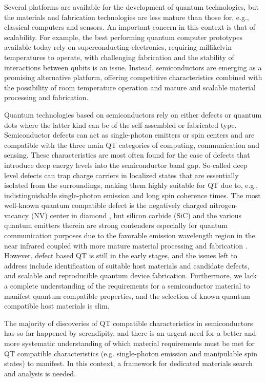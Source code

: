 \documentclass[superscriptaddress,unsortedaddress,
 amsmath,amssymb,
 aps,
]{revtex4-2}
\begin{document}
Several platforms are available for the development of quantum technologies, but the materials and fabrication technologies are less mature than those for, e.g., classical computers and sensors. 
An important concern in this context is that of scalability. 
For example, the best performing quantum computer prototypes available today rely on superconducting electronics, requiring millikelvin temperatures to operate, with challenging fabrication and the stability of interactions between qubits is an issue. Instead, semiconductors are emerging as a promising alternative platform, offering competitive characteristics combined with the possibility of room temperature operation and mature and scalable material processing and fabrication.  

Quantum technologies based on semiconductors rely on either defects or quantum dots where the latter kind can be of the self-assembled or fabricated type. 
Semiconductor defects can act as single-photon emitters or spin centers and are compatible with the three main QT categories of computing, communication and sensing.  
These characteristics are most often found for the case of defects that introduce deep energy levels into the semiconductor band gap. So-called deep level defects can trap charge carriers in localized states that are essentially isolated from the surroundings, making them highly suitable for QT due to, e.g., indistinguishable single-photon emission and long spin coherence times. 
The most well-known quantum compatible defect is the negatively charged nitrogen-vacancy (NV) center in diamond \cite{Doherty_2013}, but silicon carbide (SiC) and the various quantum emitters therein are strong contenders especially for quantum communication purposes due to the favorable emission wavelength region in the near infrared coupled with more mature material processing and fabrication \cite{Bathen2021}. 
However, defect based QT is still in the early stages, and the issues left to address include identification of suitable host materials and candidate defects, and scalable and reproducible quantum device fabrication. 
Furthermore, we lack a complete understanding of the requirements for a semiconductor material to manifest quantum compatible properties,  
and the selection of known quantum compatible host materials is slim. 

The majority of discoveries of QT compatible characteristics in semiconductors has so far happened by serendipity, and there is an urgent need for a better and more systematic understanding of which material requirements must be met for QT compatible characteristics (e.g. single-photon emission and manipulable spin states) to manifest. In this context, a framework for dedicated materials search and analysis is needed. 
\end{document}

